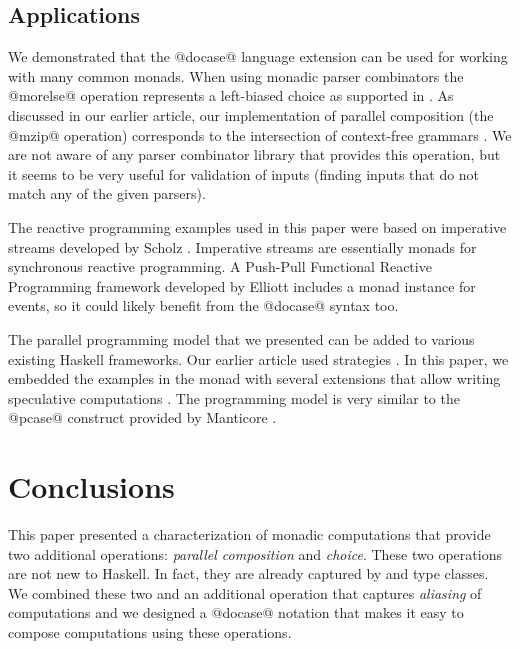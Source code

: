 \documentclass[preprint]{sigplanconf}
\begin{document}

\subsection{Applications}
We demonstrated that the @docase@ language extension can be used for working with many common 
monads. When using monadic parser combinators \cite{monadparsing} the @morelse@ operation
represents a left-biased choice as supported in \cite{parsec}. As discussed in our earlier article,
our implementation of parallel composition (the @mzip@ operation) corresponds to the intersection
of context-free grammars \cite{parcomprefun}. We are not aware of any parser combinator library that
provides this operation, but it seems to be very useful for validation of inputs (finding inputs
that do not match any of the given parsers).

The reactive programming examples used in this paper were based on imperative streams developed by 
Scholz \cite{imperative-streams}. Imperative streams are essentially monads for synchronous 
reactive programming. A Push-Pull Functional Reactive Programming framework developed by Elliott 
\cite{push-pull-frp} includes a monad instance for events, so it could likely benefit from the
@docase@ syntax too.

The parallel programming model that we presented can be added to various existing Haskell frameworks.
Our earlier article \cite{parcomprefun} used strategies \cite{strategies-new}. In this paper,
we embedded the examples in the  monad \cite{parmonad} with several extensions that 
allow writing speculative computations \cite{parmonad-cancellation}. The programming model is very
similar to the @pcase@ construct provided by Manticore \cite{manticore}.


\section{Conclusions}
This paper presented a characterization of monadic computations that provide two 
additional operations: \textit{parallel composition} and \textit{choice}. 
These two operations are not new to Haskell. In fact, they are already captured by  
and  type classes. We combined these two and an additional operation that captures
\textit{aliasing} of computations and we designed a @docase@ notation that makes it easy to compose
computations using these operations.
\end{document}
